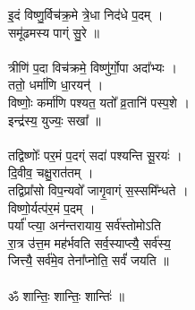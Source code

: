 इ॒दं विष्णु॒र्विच॑क्र॒मे त्रे॒धा निद॑धे प॒दम् । \\
समू॑ढमस्य पाग्ं सु॒रे ॥ \\
\\
त्रीणि॑ प॒दा विच॑क्रमे॒ विष्णु॑र्गो॒पा अदा᳚भ्यः । \\
ततो॒ धर्मा॑णि धा॒रयन्॑ । \\
विष्णोः॒ कर्मा॑णि पश्यत॒ यतो᳚ व्र॒तानि॑ पस्प॒शे । \\
इन्द्र॑स्य॒ युज्यः॒ सखा᳚ ॥\\
\\
तद्विष्णोः᳚ पर॒मं प॒दग्ं सदा॑ पश्यन्ति सू॒रयः॑ । \\
दि॒वीव॒ चक्षु॒रात॑तम् । \\
तद्विप्रा᳚सो विप॒न्यवो᳚ जागृ॒वाग्ं स॒स्समि᳚न्धते । \\
विष्णो॒र्यत्प॑र॒मं प॒दम् । \\
पर्या᳚ प्त्या॒ अन॑न्तरायाय॒ सर्व॑स्तोमोऽति \\
रा॒त्र उ॑त्त॒म मह॑र्भवति सर्व॒स्याप्त्यै॒ सर्व॑स्य॒ \\
जित्त्यै॒ सर्व॑मे॒व तेना᳚प्नोति॒ सर्वं॑ जयति ॥\\
\\
ॐ शान्तिः॒ शान्तिः॒ शान्तिः॑ ॥\\
